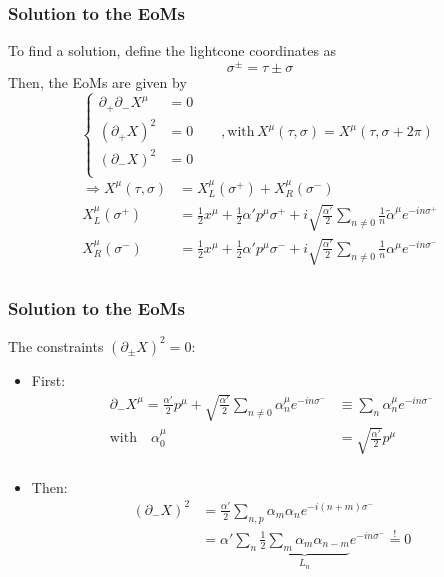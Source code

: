 \documentclass[aspectratio=169]{beamer}
\begin{document}
	\begin{frame}
		\frametitle{Solution to the EoMs}
		To find a solution, define the lightcone coordinates as
		\begin{equation*}
			\sigma^\pm = \tau\pm\sigma
		\end{equation*}
		Then, the EoMs are given by
		\begin{equation*}
			\begin{cases}
				\partial_+\partial_-X^\mu &= 0 \\
				(\partial_+X)^2 &= 0 \qquad, \text{with} \, X^\mu(\tau,\sigma) = X^\mu(\tau,\sigma+2\pi) \\
				(\partial_-X)^2 &= 0 \\
			\end{cases}
		\end{equation*}
		\begin{align*}
			\Rightarrow X^\mu(\tau,\sigma) & = X^\mu_L(\sigma^+) + X^\mu_R(\sigma^-) \\
			X^\mu_{L}(\sigma^+) &= \frac{1}{2}x^\mu + \frac{1}{2} \alpha' p^\mu \sigma^+ + i\sqrt{\frac{\alpha'}{2}} \sum_{n\neq 0} \frac{1}{n} \tilde{\alpha}^\mu e^{-in\sigma^+} \\
			X^\mu_{R}(\sigma^-) &= \frac{1}{2}x^\mu + \frac{1}{2} \alpha' p^\mu \sigma^- + i\sqrt{\frac{\alpha'}{2}} \sum_{n\neq 0} \frac{1}{n} \alpha^\mu e^{-in\sigma^-} \\
		\end{align*}
	\end{frame}

	\begin{frame}
		\frametitle{Solution to the EoMs}
		The constraints $\left(\partial_\pm X\right)^2 = 0$:
		\begin{itemize}
			\item First:
			\begin{align*}
				\partial_- X^\mu = \frac{\alpha'}{2} p^\mu + \sqrt{\frac{\alpha'}{2}} \sum_{n\neq 0 } \alpha^\mu_n e^{-in\sigma^-} & \equiv \sum_{n} \alpha^\mu_n e^{-in\sigma^-} \\
				\text{with} \quad \alpha^\mu_0 & = \sqrt{\frac{\alpha'}{2}}p^\mu \\
			\end{align*}
			\item Then:
			\begin{align*}
				\left(\partial_-X\right)^2 &= \frac{\alpha'}{2} \sum_{n,p} \alpha_m \alpha_n e^{-i(n+m)\sigma^-}\\
				& = \alpha' \sum_n \underbrace{\frac{1}{2} \sum_m \alpha_m \alpha_{n-m}}_{L_n} e^{-in\sigma^-} \stackrel{!}{=} 0
			\end{align*}
		\end{itemize}
	\end{frame}
\end{document}
